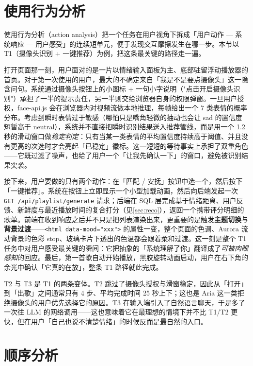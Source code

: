 \section{使用行为分析}

使用行为分析（action analysis）把一个任务在用户视角下拆成「用户动作 — 系统响应 — 用户感受」的连续短单元，便于发现交互摩擦发生在哪一步。本节以 T1（摄像头识别 + 一键推荐）为例，把这条最关键的路径走一遍。

打开页面那一刻，用户面对的是一片以情绪输入面板为主、底部驻留浮动播放器的首页。对于第一次使用的用户，最大的不确定来自「我是不是要点摄像头」这一隐含问句。系统通过摄像头按钮上的小图标 + 一句小字说明（"点击开启摄像头识别"）承担了一半的提示责任，另一半则交给浏览器自身的权限弹窗。一旦用户授权，face-api.js 会在浏览器内对视频流做本地推理，每帧给出一个 7 类表情的概率分布。考虑到瞬时表情过于敏感（哪怕只是嘴角轻微的抽动也会让 sad 的置信度短暂高于 neutral），系统并不直接把瞬时识别结果送入推荐管线，而是用一个 1.2 秒的滑动窗口做\emph{稳定判定}：只有当某一类表情的平均置信度持续高于阈值、并且没有更高的次选时才会亮起「已稳定」徽标。这一短短的等待事实上承担了双重角色——它既过滤了噪声，也给了用户一个「让我先确认一下」的窗口，避免被识别结果突袭。

接下来，用户要做的只有两个动作：在「匹配 / 安抚」按钮中选一个，然后按下「一键推荐」。系统在按钮上立即显示一个小型加载动画，然后向后端发起一次 \texttt{GET /api/playlist/generate} 请求；后端在 SQL 层完成基于情绪距离、用户反馈、新鲜度与最近播放时间的复合打分（见\cref{sec:reco}），返回一个携带评分明细的歌单。前端在收到响应之后并不只是把列表渲染出来，更重要的是触发\textbf{主题切换}与\textbf{背景过渡}——\texttt{<html data-mood="xxx">} 的属性一变，整个页面的色调、Aurora 流动背景的色彩 stop、玻璃卡片下透出的色温都会跟着柔和过渡。这一刻是整个 T1 任务中对用户感受最关键的瞬间：它把抽象的「系统理解了你」翻译成了\emph{可被肉眼感知}的回应。最后，第一首歌自动开始播放，黑胶旋转动画启动，用户在右下角的余光中确认「它真的在放」，整条 T1 路径就此完成。

T2 与 T3 是 T1 的两条变体。T2 跳过了摄像头授权与滑窗稳定，因此从「打开」到「出歌」之间通常只有 4 步、平均完成时间 25 秒上下；这也是 Aria 这一类拒绝摄像头的用户优先选择它的原因。T3 在输入端引入了自然语言聊天，于是多了一次往 LLM 的网络调用——这也意味着它在最理想的情境下并不比 T1/T2 更快，但在用户「自己也说不清楚情绪」的时候反而是最自然的入口。

\section{顺序分析}

